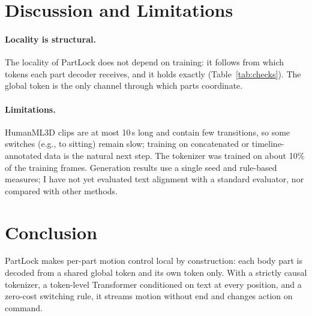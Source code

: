 \documentclass[11pt]{article}
\begin{document}
\section{Discussion and Limitations}

\paragraph{Locality is structural.}
The locality of PartLock does not depend on training: it follows from which tokens each part decoder
receives, and it holds exactly (Table~\ref{tab:checks}).
The global token is the only channel through which parts coordinate.

\paragraph{Limitations.}
HumanML3D clips are at most 10\,s long and contain few transitions, so some switches
(e.g., to sitting) remain slow; training on concatenated or timeline-annotated data is the natural next
step.
The tokenizer was trained on about 10\% of the training frames.
Generation results use a single seed and rule-based measures; I have not yet evaluated text alignment
with a standard evaluator, nor compared with other methods.

\section{Conclusion}
PartLock makes per-part motion control local by construction: each body part is decoded from a shared
global token and its own token only.
With a strictly causal tokenizer, a token-level Transformer conditioned on text at every position,
and a zero-cost switching rule, it streams motion without end and changes action on command.
\end{document}
